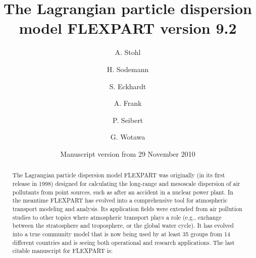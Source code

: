 \documentclass{egu}            %
\begin{document}
 

\title{The Lagrangian particle dispersion model FLEXPART version 9.2}

\author[1]{A. Stohl}
\author[1]{H. Sodemann}
\author[1]{S. Eckhardt}
\author[2]{A. Frank}
\author[2]{P. Seibert}
\author[3]{G. Wotawa}






\date{Manuscript version from 29 November 2010}





\maketitle %

\begin{abstract}
The Lagrangian particle dispersion model FLEXPART was originally (in its first
release in 1998) designed for calculating the long-range and mesoscale
dispersion of air pollutants from point sources, such as after an accident in a
nuclear power plant.  In the meantime FLEXPART has evolved into a comprehensive
tool for atmospheric transport modeling and analysis.  Its application fields
were extended from air pollution studies to other topics where atmospheric
transport plays a role (e.g., exchange between the stratosphere and
troposphere, or the global water cycle).  It has evolved into a true community
model that is now being used by at least 35 groups from 14 different countries
and is seeing both operational and research applications.  The last citable
manuscript for FLEXPART is: \citep{stohl2005}
\end{abstract}
\end{document}
